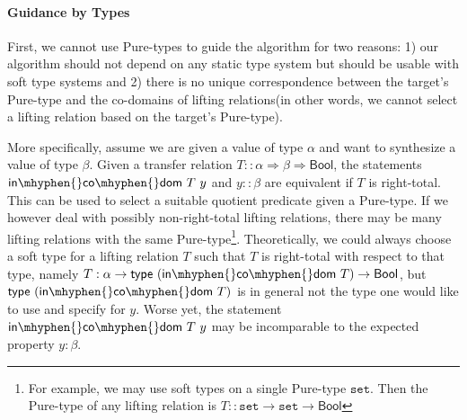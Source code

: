 \documentclass{article}
\newcommand{\kevin}[1]{\textcolor{violet}{\textbf{Kevin}: #1}}
\theoremstyle{definition}
\newcommand{\incodom}{\mathsf{in\mhyphen{}co\mhyphen{}dom}}
\newcommand{\bool}{\mathsf{Bool}}
\newcommand{\liftrel}{lifting relation\xspace}
\newcommand{\liftrels}{lifting relations\xspace}
\begin{document}
\paragraph{Guidance by Types}
First, we cannot use Pure-types to guide the algorithm for two reasons:
1) our algorithm should not depend on any static type system
but should be usable with soft type systems and
2) there is no unique correspondence between the target's Pure-type
and the co-domains of \liftrels (in other words, we cannot select a \liftrel based on the target's Pure-type).

More specifically, assume we are given a value of type $\alpha$ and want
to synthesize a value of type $\beta$.
Given a transfer relation \(T :: \alpha \Rightarrow \beta \Rightarrow \bool\),
the statements \(\incodom\ T\ y\) and \(y :: \beta\) are equivalent
if $T$ is right-total.
This can be used to select a suitable quotient predicate given a Pure-type.
If we however deal with possibly non-right-total lifting relations,
there may be many lifting relations with the same Pure-type\footnote{For example, we may use soft types on a single Pure-type $\mathtt{set}$. Then the Pure-type of any lifting relation is $T :: \mathtt{set}\to\mathtt{set}\to\bool$}.
Theoretically, we could always choose a soft type for a lifting relation \(T\)
such that \(T\) is right-total with respect to that type,
namely \(T : \alpha \rightarrow \mathsf{type}\ (\incodom\ T) \rightarrow \bool\),
but \(\mathsf{type}\ (\incodom\ T)\) is in general not the type one would like to use and specify for $y$.
Worse yet,
the statement $\incodom\ T\ y$
may be incomparable to the expected property $y : \beta$.
\end{document}
